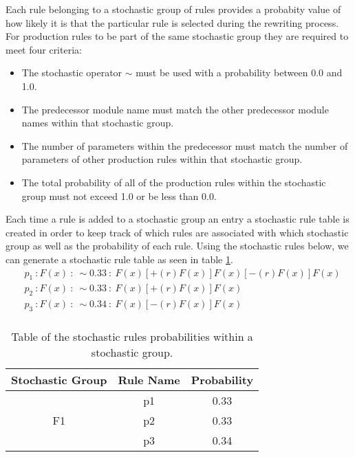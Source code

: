 \begin{flushleft}

Each rule belonging to a stochastic group of rules provides a probabity value of how likely it is that the particular rule is selected during the rewriting process. For production rules to be part of the same stochastic group they are required to meet four criteria: \\

\begin{itemize}
\item The stochastic operator $\sim$ must be used with a probability between 0.0 and 1.0.
\item The predecessor module name must match the other predecessor module names within that stochastic group.
\item The number of parameters within the predecessor must match the number of parameters of other production rules within that stochastic group.
\item The total probability of all of the production rules within the stochastic group must not exceed 1.0 or be less than 0.0.
\end{itemize}

Each time a rule is added to a stochastic group an entry a stochastic rule table is created in order to keep track of which rules are associated with which stochastic group as well as the probability of each rule. Using the stochastic rules below, we can generate a stochastic rule table as seen in table \ref{stochastic table}. \\

\begin{equation} \label{stochastic implementation example}
\begin{aligned}
	&p_1~ :  F(x)~ :~ \sim 0.33 ~ :~ F(x)[+(r)F(x)]F(x)[-(r)F(x)]F(x)\\
	&p_2~ :  F(x)~ :~ \sim 0.33 ~ :~ F(x)[+(r)F(x)]F(x)\\
	&p_3~ :  F(x)~ :~ \sim 0.34 ~ :~ F(x)[-(r)F(x)]F(x)\\
\end{aligned}
\end{equation}

\vspace{5mm}

\begin{table}[h!] \center
\begin{tabular}{ | c | c | c | }
\hline
	Stochastic Group & Rule Name & Probability\\  
\hline
\hline
\multirow{3}{*}{F1} & p1 & 0.33 \\
& p2 & 0.33 \\
& p3 & 0.34 \\
\hline
\end{tabular}
\caption{Table of the stochastic rules probabilities within a stochastic group.}
\label{stochastic table}
\end{table}
\FloatBarrier


\end{flushleft}
